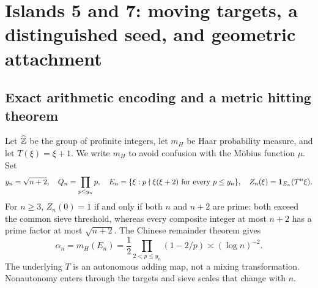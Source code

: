 \section{Islands 5 and 7: moving targets, a distinguished seed, and geometric attachment}\label{sec:dynamics}
\subsection{Exact arithmetic encoding and a metric hitting theorem}
Let $\widehat{\mathbb Z}$ be the group of profinite integers, let $m_H$ be Haar probability measure, and let $T(\xi)=\xi+1$.
We write $m_H$ to avoid confusion with the M\"obius function $\mu$. Set
\[
y_n=\sqrt{n+2},\quad Q_n=\prod_{p\le y_n}p,\quad
E_n=\{\xi:p\nmid\xi(\xi+2)\text{ for every }p\le y_n\},\quad
Z_n(\xi)=\mathbf 1_{E_n}(T^n\xi).
\]
For $n\ge3$, $Z_n(0)=1$ if and only if both $n$ and $n+2$ are prime: both exceed the common sieve threshold, whereas every composite integer at most $n+2$ has a prime factor at most $\sqrt{n+2}$.
The Chinese remainder theorem gives
\[
\alpha_n=m_H(E_n)=\frac12\prod_{2<p\le y_n}(1-2/p)\asymp(\log n)^{-2}.
\]
The underlying $T$ is an autonomous adding map, not a mixing transformation. Nonautonomy enters through the targets and sieve scales that change with $n$.

